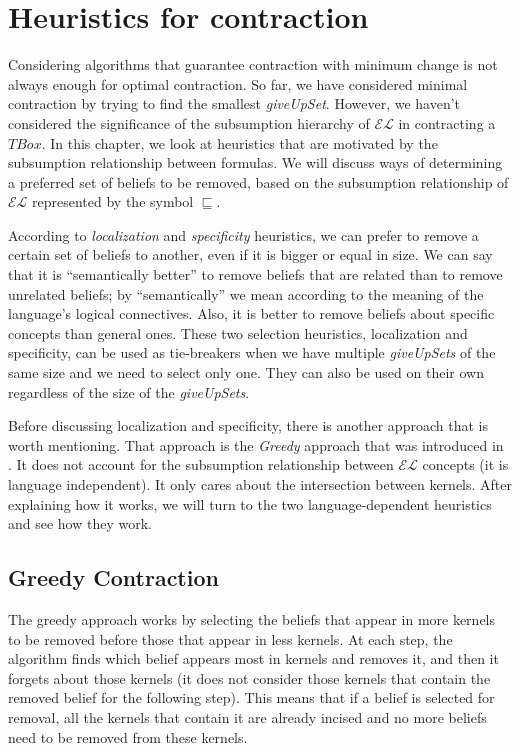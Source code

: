\chapter{Heuristics for contraction}
Considering algorithms that guarantee contraction with minimum change is not always enough for optimal contraction. So far, we have considered minimal contraction by trying to find the smallest \textit{giveUpSet}. However, we haven't considered the significance of the subsumption hierarchy of $\mathcal{EL}$ in contracting a $TBox$. In this chapter, we look at heuristics that are motivated by the subsumption relationship between formulas. We will discuss ways of determining a preferred set of beliefs to be removed, based on the subsumption relationship of $\mathcal{EL}$ represented by the symbol $\sqsubseteq$. 

According to \textit{localization} and \textit{specificity} heuristics, we can prefer to remove a certain set of beliefs to another, even if it is bigger or equal in size. We can say that it is ``semantically better'' to remove beliefs that are related than to remove unrelated beliefs; by ``semantically'' we mean according to the meaning of the language's logical connectives. Also, it is better to remove beliefs about specific concepts than general ones. These two selection heuristics, localization and specificity, can be used as tie-breakers when we have multiple \textit{giveUpSets} of the same size and we need to select only one. They can also be used on their own regardless of the size of the \textit{giveUpSets}.

Before discussing localization and specificity, there is another approach that is worth mentioning. That approach is the \textit{Greedy} approach that was introduced in \cite{zwei}. It does not account for the subsumption relationship between $\mathcal{EL}$ concepts (it is language independent). It only cares about the intersection between kernels. After explaining how it works, we will turn to the two language-dependent heuristics and see how they work.


\section{Greedy Contraction}
The greedy approach works by selecting the beliefs that appear in more kernels to be removed before those that appear in less kernels. At each step, the algorithm finds which belief appears most in kernels and removes it, and then it forgets about those kernels (it does not consider those kernels that contain the removed belief for the following step). This means that if a belief is selected for removal, all the kernels that contain it are already incised and no more beliefs need to be removed from these kernels.

